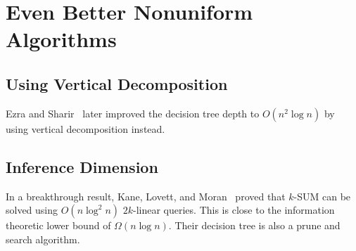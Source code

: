 \section{Even Better Nonuniform Algorithms}

\subsection{Using Vertical Decomposition}

Ezra and
Sharir~\cite{ES17}
later improved the decision tree depth to \( O(n^2 \log n) \) by using
vertical decomposition instead.

\subsection{Inference Dimension}

In a breakthrough result, Kane, Lovett, and Moran~\cite{KLM18} proved
that $k$-SUM can be solved using $O(n \log^2 n)$ $2k$-linear queries. This is
close to the information theoretic lower bound of $\Omega(n \log n)$. Their
decision tree is also a prune and search algorithm.
